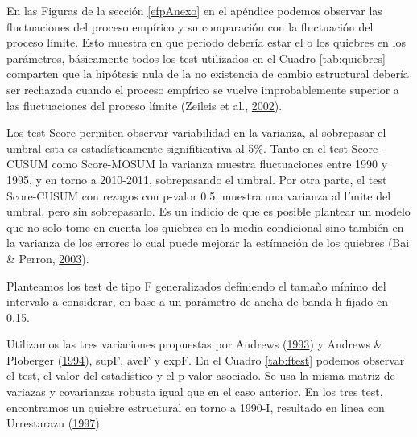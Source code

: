 \documentclass[12pt,oneside]{reedthesis}
\begin{document}
En las Figuras de la sección \ref{efpAnexo} en el apéndice podemos observar las fluctuaciones del proceso empírico y su comparación con la fluctuación del proceso límite. Esto muestra en que periodo debería estar el o los quiebres en los parámetros, básicamente todos los test utilizados en el Cuadro \ref{tab:quiebres} comparten que la hipótesis nula de la no existencia de cambio estructural debería ser rechazada cuando el proceso empírico se vuelve improbablemente superior a las fluctuaciones del proceso límite (Zeileis et al., \protect\hyperlink{ref-Zeileis2002}{2002}).

Los test Score permiten observar variabilidad en la varianza, al sobrepasar el umbral esta es estadísticamente signifiticativa al 5\%. Tanto en el test Score-CUSUM como Score-MOSUM la varianza muestra fluctuaciones entre 1990 y 1995, y en torno a 2010-2011, sobrepasando el umbral. Por otra parte, el test Score-CUSUM con rezagos con p-valor 0.5, muestra una varianza al límite del umbral, pero sin sobrepasarlo. Es un indicio de que es posible plantear un modelo que no solo tome en cuenta los quiebres en la media condicional sino también en la varianza de los errores lo cual puede mejorar la estímación de los quiebres (Bai \& Perron, \protect\hyperlink{ref-BaiPerron2003}{2003}).

Planteamos los test de tipo F generalizados definiendo el tamaño mínimo del intervalo a considerar, en base a un parámetro de ancha de banda h fijado en 0.15.

Utilizamos las tres variaciones propuestas por Andrews (\protect\hyperlink{ref-Andrews1993}{1993}) y Andrews \& Ploberger (\protect\hyperlink{ref-Andrews1994}{1994}), supF, aveF y expF. En el Cuadro \ref{tab:ftest} podemos observar el test, el valor del estadístico y el p-valor asociado. Se usa la misma matriz de variazas y covarianzas robusta igual que en el caso anterior. En los tres test, encontramos un quiebre estructural en torno a 1990-I, resultado en linea con Urrestarazu (\protect\hyperlink{ref-Urrestarazu1997}{1997}).
\end{document}
